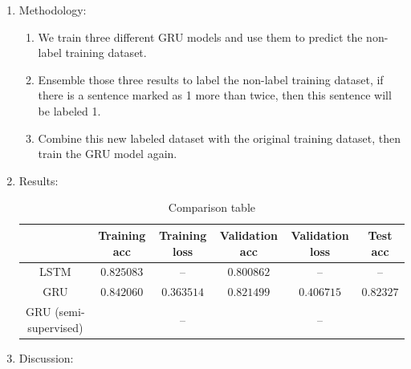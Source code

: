 \documentclass[a4paper,11pt]{article}
\begin{document}
\begin{enumerate}
\begin{enumerate}
		\item Methodology:

			\begin{enumerate}
				\item We train three different GRU models and use them to predict the non-label training dataset.

				\item Ensemble those three results to label the non-label training dataset, if there is a sentence marked as 1 more than twice, then this sentence will be labeled 1.

				\item Combine this new labeled dataset with the original training dataset, then train the GRU model again.\\
			\end{enumerate}

		\item Results:\\

			\begin{table}[htp]
				\begin{center}
					\begin{tabular}{ | c | c | c | c | c | c |}
					  	\hline
				  		& Training acc & Training loss & Validation acc & Validation loss & Test acc\\[0.5ex] 
				  		\hline \hline
				  		LSTM & $0.825083$ & -- & $0.800862$ & -- & --\\[0.2ex]
				  		\hline
				  		GRU & $0.842060$ & $0.363514$ & $0.821499$ & $0.406715$ & $0.82327$\\[0.2ex]
				  		\hline
				  		GRU (semi-supervised) &  & -- &  & -- & \\[0.2ex]
				  		\hline
					\end{tabular}
					\caption{Comparison table}
				\end{center}
			\end{table}

		\item Discussion:\\

	\end{enumerate}

\end{enumerate}
\end{document}
